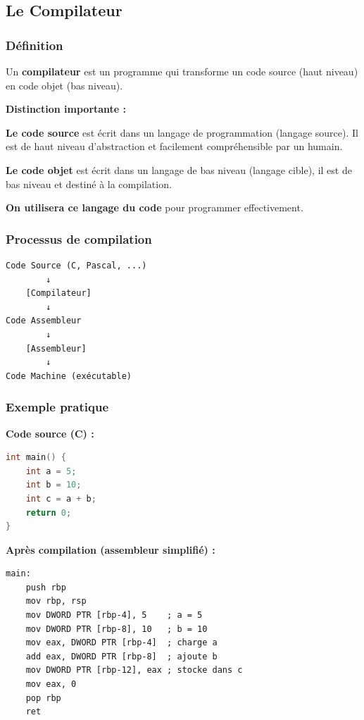 \documentclass[12pt,a4paper]{article}
\begin{document}
\newpage
\subsection{Le Compilateur}

\subsubsection{Définition}

\begin{definition}
Un \textbf{compilateur} est un programme qui transforme un code source (haut niveau) en code objet (bas niveau).
\end{definition}

\begin{notecours}
\textbf{Distinction importante :}

\textbf{Le code source} est écrit dans un langage de programmation (langage source). Il est de haut niveau d'abstraction et facilement compréhensible par un humain.

\textbf{Le code objet} est écrit dans un langage de bas niveau (langage cible), il est de bas niveau et destiné à la compilation. 

\textbf{On utilisera ce langage du code} pour programmer effectivement. 
\end{notecours}

\subsubsection{Processus de compilation}

\begin{astuce}
\begin{verbatim}
Code Source (C, Pascal, ...)
        ↓
    [Compilateur]
        ↓
Code Assembleur
        ↓
    [Assembleur]
        ↓
Code Machine (exécutable)
\end{verbatim}
\end{astuce}

\subsubsection{Exemple pratique}

\begin{exemple}
\textbf{Code source (C) :}
\begin{lstlisting}[language=C]
int main() {
    int a = 5;
    int b = 10;
    int c = a + b;
    return 0;
}
\end{lstlisting}

\textbf{Après compilation (assembleur simplifié) :}
\begin{lstlisting}[language={[x86masm]Assembler}]
main:
    push rbp
    mov rbp, rsp
    mov DWORD PTR [rbp-4], 5    ; a = 5
    mov DWORD PTR [rbp-8], 10   ; b = 10
    mov eax, DWORD PTR [rbp-4]  ; charge a
    add eax, DWORD PTR [rbp-8]  ; ajoute b
    mov DWORD PTR [rbp-12], eax ; stocke dans c
    mov eax, 0
    pop rbp
    ret
\end{lstlisting}
\end{exemple}
\end{document}
